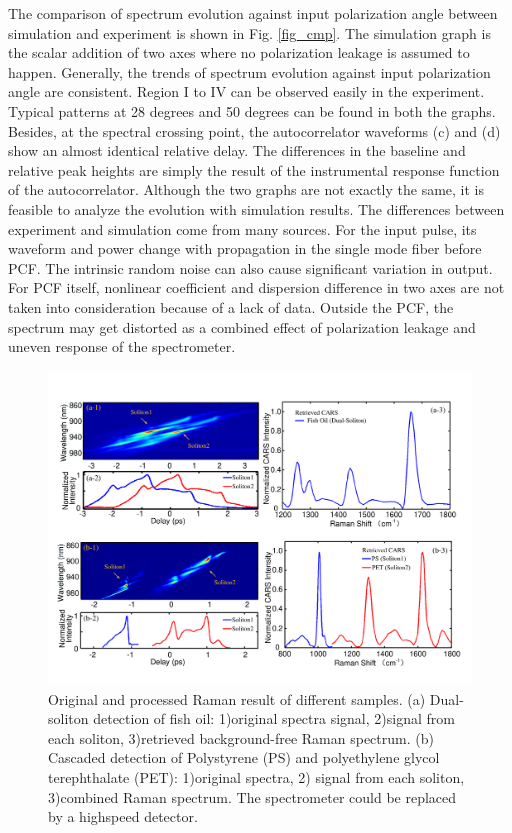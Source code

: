 \documentclass{osa-article}
\begin{document}
The comparison of spectrum evolution against input polarization angle between simulation and experiment is shown in Fig. \ref{fig_cmp}. The simulation graph is the scalar addition of two axes where no polarization leakage is assumed to happen. Generally, the trends of spectrum evolution against input polarization angle are consistent. Region I to IV can be observed easily in the experiment. Typical patterns at 28 degrees and 50 degrees can be found in both the graphs. Besides, at the spectral crossing point, the autocorrelator waveforms (c) and (d) show an almost identical relative delay. The differences in the baseline and relative peak heights are simply the result of the instrumental response function of the autocorrelator. Although the two graphs are not exactly the same, it is feasible to analyze the evolution with simulation results. The differences between experiment and simulation come from many sources. For the input pulse, its waveform and power change with propagation in the single mode fiber before PCF. The intrinsic random noise can also cause significant variation in output\cite{dudley_supercontinuum_2006}. For PCF itself, nonlinear coefficient and dispersion difference in two axes are not taken into consideration because of a lack of data. Outside the PCF, the spectrum may get distorted as a combined effect of polarization leakage and uneven response of the spectrometer.


\begin{figure}[htbp]
    \centering%
    \includegraphics[width=\textwidth]{fig_cars.pdf}
    \caption{Original and processed Raman result of different samples. (a) Dual-soliton detection of fish oil: 1)original spectra signal, 2)signal from each soliton, 3)retrieved background-free Raman spectrum. (b) Cascaded detection of Polystyrene (PS) and polyethylene glycol terephthalate (PET): 1)original spectra, 2) signal from each soliton, 3)combined Raman spectrum. The spectrometer could be replaced by a highspeed detector.}
    \label{fig_CARS}\vspace*{-6pt}
\end{figure}
\end{document}
